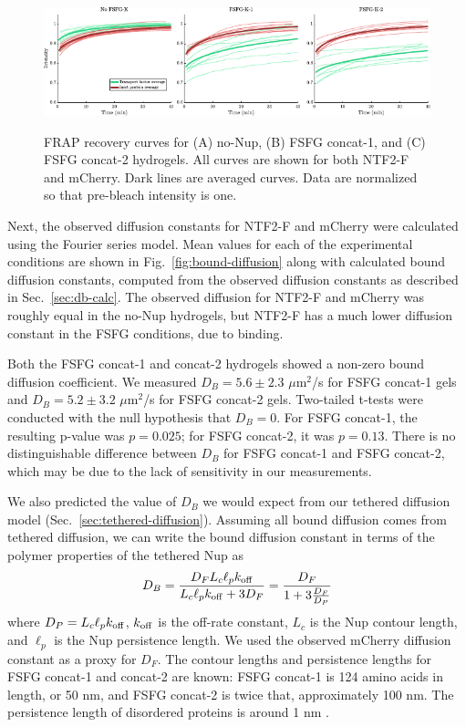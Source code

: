 \begin{figure}
\caption[FRAP recovery curves.]{FRAP recovery curves for (A) no-Nup, (B) FSFG concat-1, and (C) FSFG concat-2 hydrogels.  All curves are shown for both NTF2-F and mCherry.  Dark lines are averaged curves.  Data are normalized so that pre-bleach intensity is one.}
\centering
\includegraphics[width=\textwidth]{figs/ch04/curves}
\label{fig:curves}
\end{figure} 

Next, the observed diffusion constants for NTF2-F and mCherry were calculated using the Fourier series model.  Mean values for each of the experimental conditions are shown in Fig.~\ref{fig:bound-diffusion} along with calculated bound diffusion constants, computed from the observed diffusion constants as described in Sec.~\ref{sec:db-calc}.  The observed diffusion for NTF2-F and mCherry was roughly equal in the no-Nup hydrogels, but NTF2-F has a much lower diffusion constant in the FSFG conditions, due to binding.  

Both the FSFG concat-1 and concat-2 hydrogels showed a non-zero bound diffusion coefficient.  We measured $D_B = 5.6\pm2.3$ $\mu$m$^2$/s for FSFG concat-1 gels and $D_B = 5.2\pm3.2$ $\mu$m$^2$/s for FSFG concat-2 gels.  Two-tailed t-tests were conducted with the null hypothesis that $D_B = 0$.  For FSFG concat-1, the resulting p-value was $p = 0.025$; for FSFG concat-2, it was $p = 0.13$.  There is no distinguishable difference between $D_B$ for FSFG concat-1 and FSFG concat-2, which may be due to the lack of sensitivity in our measurements.

We also predicted the value of $D_B$ we would expect from our tethered diffusion model (Sec.~\ref{sec:tethered-diffusion}).  Assuming all bound diffusion comes from tethered diffusion, we can write the bound diffusion constant in terms of the polymer properties of the tethered Nup as
\begin{equation}\label{eq:dbound-ch4}
  D_B = \frac{D_F L_c \ell_p
    k_{\mathrm{off}}}{L_c \ell_p k_{\mathrm{off}} + 3D_F} =
  \frac{D_F}{1+3\frac{D_F}{D_{P}}}
\end{equation}
where $D_P = L_c \ell_p k_{\mathrm{off}}$, $k_{\rm off}$ is the off-rate constant, $L_c$ is the Nup contour length, and $\ell_p$ is the Nup persistence length.  We used the observed mCherry diffusion constant as a proxy for $D_F$.  The contour lengths and persistence lengths for FSFG concat-1 and concat-2 are known: FSFG concat-1 is 124 amino acids in length, or 50 nm, and FSFG concat-2 is twice that, approximately 100 nm.  The persistence length of disordered proteins is around 1 nm \cite{receveur-brechot12}.

